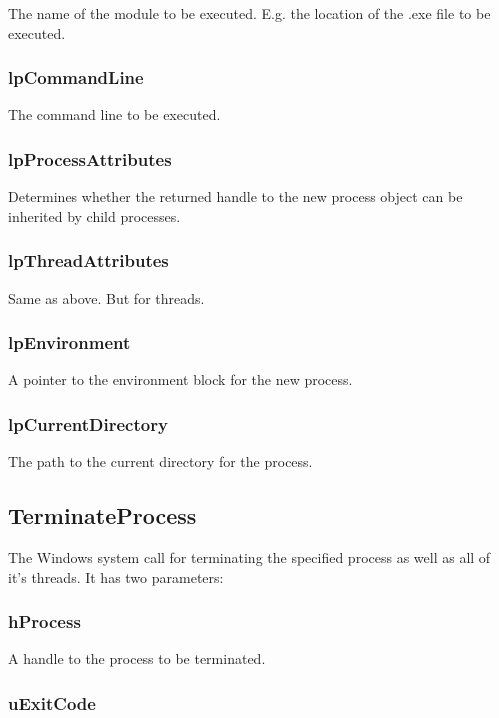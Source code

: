 \documentclass[a4]{article}
\begin{document}
The name of the module to be executed. E.g. the location of the .exe file to be executed.

\subsubsection*{lpCommandLine}

The command line to be executed.

\subsubsection*{lpProcessAttributes}

Determines whether the returned handle to the new process object can be inherited by child processes.

\subsubsection*{lpThreadAttributes}

Same as above. But for threads.

\subsubsection*{lpEnvironment}

A pointer to the environment block for the new process.

\subsubsection*{lpCurrentDirectory}

The path to the current directory for the process.

\subsection*{TerminateProcess}

The Windows system call for terminating the specified process as well as all of it's threads. It has two parameters:

\subsubsection*{hProcess}

A handle to the process to be terminated.

\subsubsection*{uExitCode}
\end{document}
